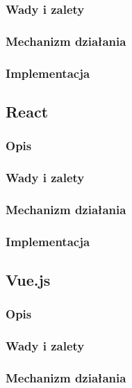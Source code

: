 \documentclass[polish, twoside, 12pt]{mwart}
\begin{document}
\subsubsection{Wady i zalety}

\subsubsection{Mechanizm działania}

\subsubsection{Implementacja}

\subsection{React}

\subsubsection{Opis}

\subsubsection{Wady i zalety}

\subsubsection{Mechanizm działania}

\subsubsection{Implementacja}

\subsection{Vue.js}

\subsubsection{Opis}

\subsubsection{Wady i zalety}

\subsubsection{Mechanizm działania}
\end{document}
